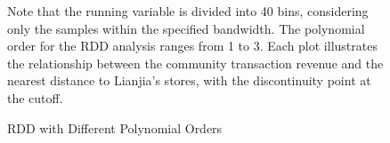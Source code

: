 \documentclass[11pt]{article}
\begin{document}
\begin{figure}[ht]
    \centering
    \hfill %
    \hfill %
    \caption{RDD with Different Polynomial Orders}
    \label{fig:RD_design}

    Note that the running variable is divided into 40 bins, considering only the samples within the specified bandwidth. The polynomial order for the RDD analysis ranges from 1 to 3. Each plot illustrates the relationship between the community transaction revenue and the nearest distance to Lianjia's stores, with the discontinuity point at the cutoff.
\end{figure}


\end{document}
